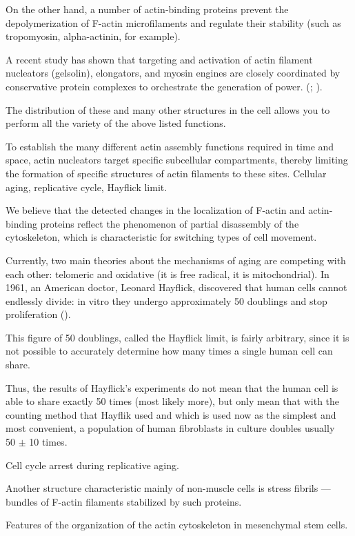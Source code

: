 \documentclass[english,authoryear]{elsarticle}
\begin{document}
On the other hand, a number of actin-binding proteins prevent the depolymerization of F-actin microfilaments and regulate their stability (such as tropomyosin, alpha-actinin, for example).

A recent study has shown that targeting and activation of actin filament nucleators (gelsolin), elongators, and myosin engines are closely coordinated by conservative protein complexes to orchestrate the generation of power. (\cite{pantaloni1993profilin}; \cite{sept2001thermodynamics}).

The distribution of these and many other structures in the cell allows you to perform all the variety of the above listed functions.

To establish the many different actin assembly functions required in time and space, actin nucleators target specific subcellular compartments, thereby limiting the formation of specific structures of actin filaments to these sites.
Cellular aging, replicative cycle, Hayflick limit.

We believe that the detected changes in the localization of F-actin and actin-binding proteins reflect the phenomenon of partial disassembly of the cytoskeleton, which is characteristic for switching types of cell movement.


Currently, two main theories about the mechanisms of aging are competing with each other: telomeric and oxidative (it is free radical, it is mitochondrial). In 1961, an American doctor, Leonard Hayflick, discovered that human cells cannot endlessly divide: in vitro they undergo approximately 50 doublings and stop proliferation (\cite{hayflick1961serial}).

This figure of 50 doublings, called the Hayflick limit, is fairly arbitrary, since it is not possible to accurately determine how many times a single human cell can share.

Thus, the results of Hayflick's experiments do not mean that the human cell is able to share exactly 50 times (most likely more), but only mean that with the counting method that Hayflik used and which is used now as the simplest and most convenient, a population of human fibroblasts in culture doubles usually ~ 50 $\pm$ 10 times.

Cell cycle arrest during replicative aging.

Another structure characteristic mainly of non-muscle cells is stress fibrils — bundles of F-actin filaments stabilized by such proteins.

Features of the organization of the actin cytoskeleton in mesenchymal stem cells.
\end{document}
